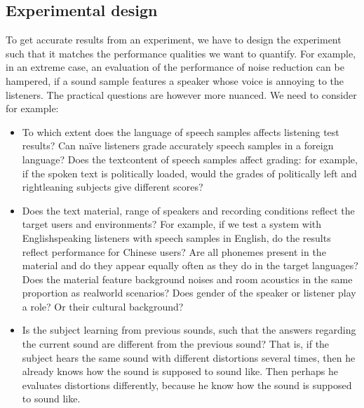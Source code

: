 \documentclass[letterpaper,10pt,english]{jupyterBook}
\begin{document}
\subsection{Experimental design}
\label{\detokenize{Evaluation/Subjective_quality_evaluation:experimental-design}}
\sphinxAtStartPar
To get accurate results from an experiment, we have to design the
experiment such that it matches the performance qualities we want to
quantify. For example, in an extreme case, an evaluation of the
performance of noise reduction can be hampered, if a sound sample
features a speaker whose voice is annoying to the listeners. The
practical questions are however more nuanced. We need to consider for
example:
\begin{itemize}
\item {} 
\sphinxAtStartPar
To which extent does the language of speech samples affects
listening test results? Can naïve listeners grade accurately speech
samples in a foreign language? Does the text\sphinxhyphen{}content of speech
samples affect grading: for example, if the spoken text is
politically loaded, would the grades of politically left\sphinxhyphen{} and
right\sphinxhyphen{}leaning subjects give different scores?

\item {} 
\sphinxAtStartPar
Does the text material, range of speakers and recording conditions
reflect the target users and environments? For example, if we test a
system with English\sphinxhyphen{}speaking listeners with speech samples in
English, do the results reflect performance for Chinese users? Are
all phonemes present in the material and do they appear equally
often as they do in the target languages? Does the material feature
background noises and room acoustics in the same proportion as
real\sphinxhyphen{}world scenarios? Does gender of the speaker or listener play a
role? Or their cultural background?

\item {} 
\sphinxAtStartPar
Is the subject learning from previous sounds, such that the answers
regarding the current sound are different from the previous sound?
That is, if the subject hears the same sound with different
distortions several times, then he already knows how the sound is
supposed to sound like. Then perhaps he evaluates distortions
differently, because he know how the sound is supposed to sound
like.

\end{itemize}
\end{document}

